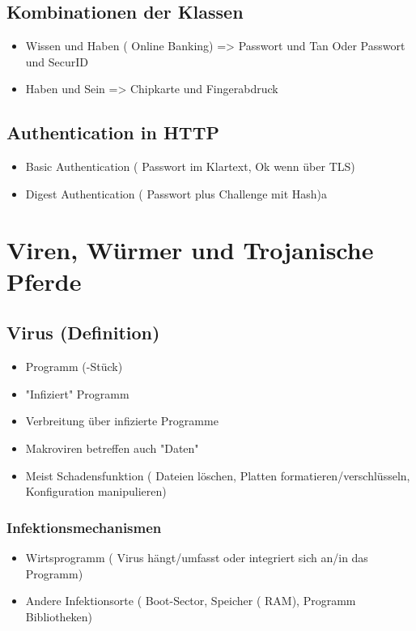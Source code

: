 {\subsection*{ Kombinationen der Klassen}
\begin{itemize}
	\item Wissen und Haben ( Online Banking) => Passwort und Tan Oder Passwort und SecurID
	\item Haben und Sein => Chipkarte und Fingerabdruck
\end{itemize}

\subsection*{ Authentication in HTTP}
\begin{itemize}
	\item Basic Authentication ( Passwort im Klartext, Ok wenn über TLS)
	\item Digest Authentication ( Passwort plus Challenge mit Hash)a
\end{itemize}




\section*{Viren, Würmer und Trojanische Pferde}
	\subsection*{ Virus (Definition)}
	\begin{itemize}
		\item Programm (-Stück)
		\item "Infiziert" Programm
		\item Verbreitung über infizierte Programme
		\item Makroviren betreffen auch "Daten" 
		\item Meist Schadensfunktion ( Dateien löschen, Platten formatieren/verschlüsseln, Konfiguration manipulieren)
	\end{itemize}
	\subsubsection*{ Infektionsmechanismen}
	\begin{itemize}
		\item Wirtsprogramm ( Virus hängt/umfasst oder integriert sich an/in das Programm)
		\item Andere Infektionsorte ( Boot-Sector, Speicher ( RAM), Programm Bibliotheken)
	\end{itemize}
	
}
